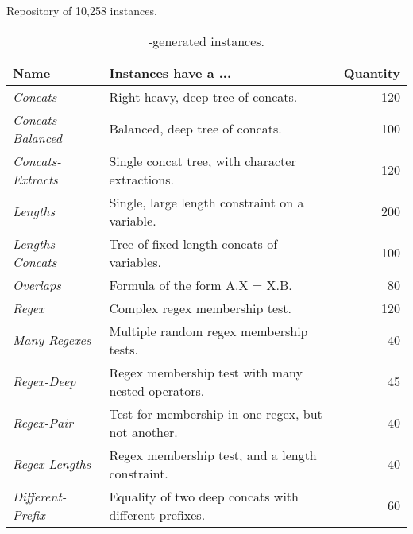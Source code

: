 \begin{table}[t]
    \caption{Repository of 10,258 \smtfull{} instances.}
    \begin{subtable}{1\textwidth}
        \centering
        \caption{\generator{}-generated instances.}
        \label{tbl:generated}
        \begin{tabular}{llr}
            \toprule
            \textbf{Name}
                & \textbf{Instances have a ...}
                & \textbf{Quantity}
            \\
            \midrule
            \textit{Concats}
                & Right-heavy, deep tree of concats.
                & 120 \\
            \textit{Concats-Balanced}
                & Balanced, deep tree of concats.
                & 100 \\
            \textit{Concats-Extracts}
                & Single concat tree, with character extractions.
                & 120 \\
            \textit{Lengths}
                & Single, large length constraint on a variable.
                & 200 \\
            \textit{Lengths-Concats}
                & Tree of fixed-length concats of variables.
                & 100 \\
            \textit{Overlaps}
                & Formula of the form A.X = X.B.
                & 80 \\
            \textit{Regex}
                & Complex regex membership test.
                & 120 \\
            \textit{Many-Regexes}
                & Multiple random regex membership tests.
                & 40 \\
            \textit{Regex-Deep}
                & Regex membership test with many nested operators.
                & 45 \\
            \textit{Regex-Pair}
                & Test for membership in one regex, but not another.
                & 40 \\
            \textit{Regex-Lengths}
                & Regex membership test, and a length constraint.
                & 40 \\
            \textit{Different-Prefix}
                & Equality of two deep concats with different prefixes.
                & 60 \\
            \bottomrule
        \end{tabular}
    \end{subtable}


\end{table}
